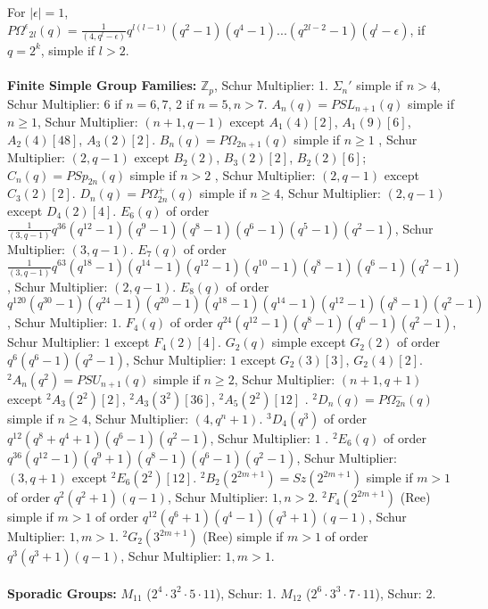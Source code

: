 For $|\epsilon|=1$,
${P\Omega^{\epsilon}}_{2l}(q)= {\frac 1 {(4,q^l - \epsilon)}}
q^{l(l-1)}(q^{2} -1) (q^{4} -1) ...  
(q^{2l-2} -1)
(q^{l} - \epsilon)$,
if $q=2^k$, simple if $l>2$.\\
\\
{\bf Finite Simple Group Families: }
${\mathbb Z}_p$, Schur Multiplier: 1.
$\Sigma_n'$ simple if $n>4$,
Schur Multiplier: 6 if $n= 6,7$, 2 if $n=5, n>7$.
$A_n (q) = PSL_{n+1}(q)$ simple if $ n \geq 1$, 
Schur Multiplier: $(n+1,q-1)$ except 
$A_1(4) [2]$,
$A_1(9) [6]$,
$A_2(4) [48]$,
$A_3(2) [2]$.
$B_n (q)= P\Omega_{2n+1}(q)$
simple if $ n \geq 1$ , Schur Multiplier: $(2,q-1)$ except
$B_2(2)$,
$B_3(2) [2]$,
$B_2(2) [6]$;
$C_n (q)= PSp_{2n} (q)$ simple if $n > 2$ , Schur Multiplier: 
$(2,q-1)$ except $C_3(2) [2]$.
$D_n (q)= P\Omega_{2n}^{+}(q)$ simple if $n \geq 4$, 
Schur Multiplier: $(2,q-1)$ except $D_4(2) [4]$.
$E_6 (q)$ of order 
${\frac 1 {(3,q-1)}} q^{36} (q^{12}-1)(q^{9}-1) (q^{8}-1) (q^{6}-1) (q^{5}-1) (q^{2}-1)$, 
Schur Multiplier: $(3,q-1)$.
$E_7 (q)$ 
of order 
${\frac 1 {(3,q-1)}} q^{63} (q^{18}-1) (q^{14}-1) (q^{12}-1) 
(q^{10}-1) (q^{8}-1) (q^{6}-1) (q^{2}-1)$, 
Schur Multiplier: $(2,q-1)$.
$E_8 (q)$ 
of order 
$q^{120} (q^{30}-1) (q^{24}-1) (q^{20}-1) 
(q^{18}-1) (q^{14}-1) (q^{12}-1) (q^{8}-1) (q^{2}-1)$, 
Schur Multiplier: $1$.
$F_4 (q)$ of order $q^{24} (q^{12}-1) (q^{8}-1) (q^{6}-1) (q^{2}-1)$, 
Schur Multiplier: $1$ except $F_4(2)[4]$.
$G_2 (q)$ simple except $G_2(2)$
of order 
$q^{6} (q^{6}-1)(q^{2}-1)$, 
Schur Multiplier: $1$ except $G_2(3) [3]$, $G_2(4) [2]$.
$^2A_n (q^2) = PSU_{n+1}(q)$ simple if $ n \geq 2$, Schur Multiplier: 
$(n+1, q+1)$ except
$^2A_3(2^2) [2]$,
$^2A_3(3^2) [36]$,
$^2A_5(2^2) [12]$ .
$^2D_n (q)= P\Omega_{2n}^{-}(q)$
simple if $ n \geq 4$, Schur Multiplier: $(4, q^n+1)$.
$^3D_4 (q^3)$ 
of order 
$q^{12} (q^{8}+q^4+1) (q^{6}-1) (q^{2}-1)$, 
Schur Multiplier: $1$ .
$^2E_6 (q)$ 
of order 
$q^{36} (q^{12}-1) (q^{9}+1) (q^{8}-1) (q^{6}-1) (q^{2}-1)$, 
Schur Multiplier: $(3,q+1)$ except
$^2E_6(2^2) [12]$.
$^2B_2 (2^{2m+1})= Sz(2^{2m+1})$
simple if $ m > 1$ 
of order 
$q^{2} (q^{2}+1) (q-1)$, 
Schur Multiplier: $1, n>2$.
$^2F_4 (2^{2m+1})$ (Ree) simple if $ m >1$
of order 
$q^{12} (q^{6}+1) (q^{4}-1) (q^{3}+1) (q-1)$, 
Schur Multiplier: $1,m>1$.
$^2G_2 (3^{2m+1})$ (Ree) simple if $ m > 1$
of order 
$q^{3} (q^{3}+1) (q-1)$, 
Schur Multiplier: $1, m>1$.\\
\\
{\bf Sporadic Groups:}
$M_{11}$ ($2^4 \cdot 3^2 \cdot 5 \cdot 11$), Schur: 1.
$M_{12}$ ($2^6 \cdot 3^3 \cdot 7 \cdot 11$), Schur: 2.
